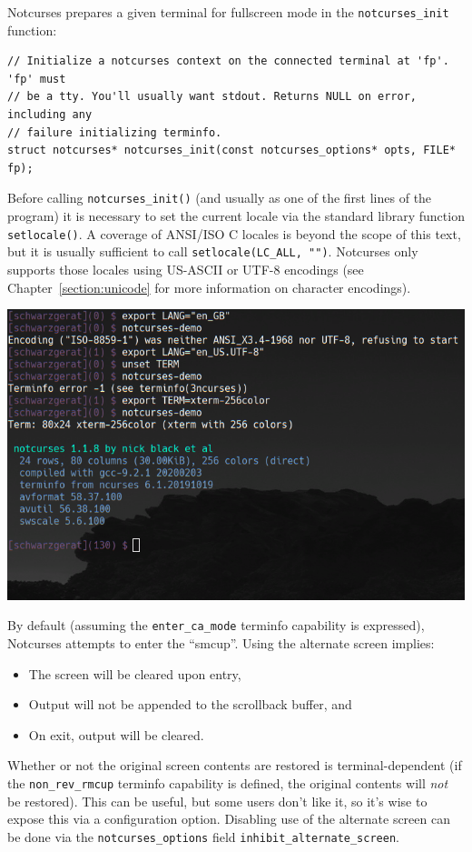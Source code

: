 \documentclass[letterpaper,10pt]{article}
\newenvironment{denseitemize}{
  \begin{itemize}
      \setlength{\itemsep}{0pt}
}{
  \end{itemize}
}
\begin{document}
Notcurses prepares a given terminal for fullscreen mode in the
\texttt{notcurses\_init} function:

\begin{listing}[ht]
\begin{verbatim}
// Initialize a notcurses context on the connected terminal at 'fp'. 'fp' must
// be a tty. You'll usually want stdout. Returns NULL on error, including any
// failure initializing terminfo.
struct notcurses* notcurses_init(const notcurses_options* opts, FILE* fp);
\end{verbatim}
\end{listing}

Before calling \texttt{notcurses\_init()} (and usually as one of the first lines
of the program) it is necessary to set the current locale via the standard
library function \texttt{setlocale()}. A coverage of ANSI/ISO C locales is beyond
the scope of this text, but it is usually sufficient to call
\texttt{setlocale(LC\_ALL, "")}. Notcurses only supports those locales using
US-ASCII or UTF-8 encodings (see Chapter~\ref{section:unicode} for more
information on character encodings).

    \begin{center}
      \includegraphics[width=.7\linewidth]{media/notcurses-init-fails.png}
    \end{center}

By default (assuming the \texttt{enter\_ca\_mode} terminfo capability is expressed),
Notcurses attempts to enter the ``\gls{smcup}''. Using the alternate screen
implies:
\begin{denseitemize}
\item{The screen will be cleared upon entry,}
\item{Output will not be appended to the scrollback buffer, and}
\item{On exit, output will be cleared.}
\end{denseitemize}
Whether or not the original screen contents are restored is terminal-dependent
(if the \texttt{non\_rev\_rmcup} terminfo capability is defined, the original
contents will \textit{not} be restored). This can be useful, but some users
don't like it, so it's wise to expose this via a configuration option.
Disabling use of the alternate screen can be done via the
\texttt{notcurses\_options} field \texttt{inhibit\_alternate\_screen}.
\end{document}
